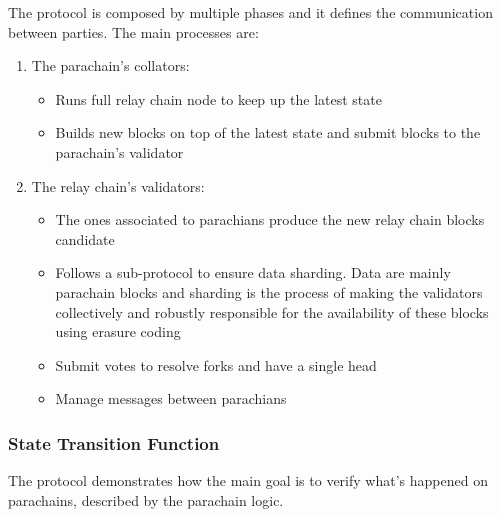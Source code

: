 \documentclass[../main.tex]{subfiles}
\begin{document}
The protocol is composed by multiple phases and it defines the communication between parties. The main processes are:~\cite{burdges2020overview}


\begin{enumerate}
  \item The parachain's collators:
        \begin{itemize}
                \item Runs full relay chain node to keep up the latest state
                \item Builds new blocks on top of the latest state and submit blocks to the parachain's validator
        \end{itemize}
  \item The relay chain's validators:
    \begin{itemize}
      \item The ones associated to parachians produce the new relay chain blocks candidate
      \item Follows a sub-protocol to ensure data sharding. Data are mainly parachain blocks and sharding is the process of making the validators collectively and robustly responsible for the availability of these blocks using erasure coding


      \item Submit votes to resolve forks and have a single head


      
      \item Manage messages between parachians
    \end{itemize}
\end{enumerate}

\subsubsection{State Transition Function}

The protocol demonstrates how the main goal is to verify what's happened on parachains, described by the parachain logic. 

\end{document}
